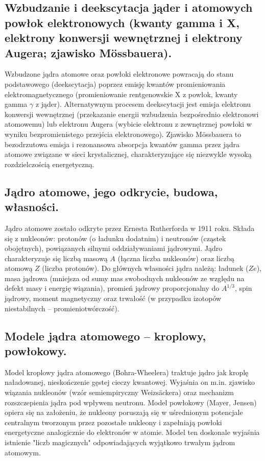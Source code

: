 \documentclass[11pt,a4paper]{article}
\begin{document}
\subsection{Wzbudzanie i deekscytacja jąder i atomowych powłok elektronowych (kwanty gamma i X, elektrony konwersji wewnętrznej i elektrony Augera; zjawisko Mössbauera).}
Wzbudzone jądra atomowe oraz powłoki elektronowe powracają do stanu podstawowego (deekscytacja) poprzez emisję kwantów promieniowania elektromagnetycznego (promieniowanie rentgenowskie X z powłok, kwanty gamma $\gamma$ z jąder). Alternatywnym procesem deekscytacji jest emisja elektronu konwersji wewnętrznej (przekazanie energii wzbudzenia bezpośrednio elektronowi atomowemu) lub elektronu Augera (wybicie elektronu z zewnętrznej powłoki w wyniku bezpromienistego przejścia elektronowego). Zjawisko Mössbauera to bezodrzutowa emisja i rezonansowa absorpcja kwantów gamma przez jądra atomowe związane w sieci krystalicznej, charakteryzujące się niezwykle wysoką rozdzielczością energetyczną.

\subsection{Jądro atomowe, jego odkrycie, budowa, własności.}
Jądro atomowe zostało odkryte przez Ernesta Rutherforda w 1911 roku. Składa się z nukleonów: protonów (o ładunku dodatnim) i neutronów (cząstek obojętnych), powiązanych silnymi oddziaływaniami jądrowymi. Jądro charakteryzuje się liczbą masową $A$ (łączna liczba nukleonów) oraz liczbą atomową $Z$ (liczba protonów). Do głównych własności jądra należą: ładunek ($Ze$), masa jądrowa (mniejsza od sumy mas swobodnych nukleonów ze względu na defekt masy i energię wiązania), promień jądrowy proporcjonalny do $A^{1/3}$, spin jądrowy, moment magnetyczny oraz trwałość (w przypadku izotopów niestabilnych -- promieniotwórczość).

\subsection{Modele jądra atomowego -- kroplowy, powłokowy.}
Model kroplowy jądra atomowego (Bohra-Wheelera) traktuje jądro jak kroplę naładowanej, nieskończenie gęstej cieczy kwantowej. Wyjaśnia on m.in. zjawisko wiązania nukleonów (wzór semiempiryczny Weizsäckera) oraz mechanizm rozszczepienia jądra pod wpływem neutronu. Model powłokowy (Mayer, Jensen) opiera się na założeniu, że nukleony poruszają się w uśrednionym potencjale centralnym tworzonym przez pozostałe nukleony i zapełniają powłoki energetyczne analogicznie do elektronów w atomie. Model ten doskonale wyjaśnia istnienie "liczb magicznych" odpowiadających wyjątkowo trwałym jądrom atomowym.
\end{document}
